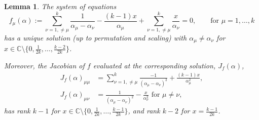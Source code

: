 \documentclass[11pt]{amsart}
\newtheorem{lemma}[theorem]{Lemma}
\theoremstyle{remark}
\numberwithin{equation}{section}
\begin{document}
\begin{lemma} \label{lemma_boundary}
The system of equations
\begin{equation} \label{equation_boundary}
    f_{\mu}(\alpha) := \sum_{\nu=1, \neq \mu}^k \frac{1}{\alpha_{\mu} - \alpha_{\nu}} - \frac{(k-1)x}{\alpha_{\mu}} + \sum_{\nu=1, \neq \mu}^k \frac{x}{\alpha_{\nu}} =0, \qquad \mbox{for $\mu =1 ,\dots,k$}
\end{equation}
has a unique solution (up to permutation and scaling) with $\alpha_\mu \neq \alpha_\nu$ for $x \in \mathbb{C}\setminus\{ 0, \frac{1}{2k}, \dots, \frac{k-2}{2k} \}$. 

Moreover, the Jacobian of $f$ evaluated at the corresponding solution, $J_f(\alpha)$,
\[
\begin{split}
    J_f(\alpha)_{\mu\mu} &= \sum_{\nu=1,\neq \mu}^k \frac{-1}{(\alpha_\mu-\alpha_\nu)^2} + \frac{(k-1)x}{\alpha_\mu^2}, 
    \\
    J_f(\alpha)_{\mu\nu} &= \frac{1}{(\alpha_\mu - \alpha_\nu)^2} - \frac{x}{\alpha_\nu^2} \text{ for } \mu \neq \nu,
\end{split}
\]
has rank $k-1$ for $x \in \mathbb{C}\setminus\{0, \frac{1}{2k}, \dots, \frac{k-1}{2k}\}$, and rank $k-2$ for $x = \frac{k-1}{2k}$. 
\end{lemma}
\end{document}
